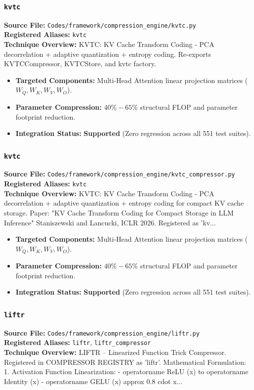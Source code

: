 \subsubsection{\texttt{kvtc}}
\textbf{Source File:} \texttt{Codes/framework/compression\_engine/kvtc.py} \\
\textbf{Registered Aliases:} \texttt{kvtc} \\
\textbf{Technique Overview:} KVTC: KV Cache Transform Coding - PCA decorrelation + adaptive quantization + entropy coding. Re-exports KVTCCompressor, KVTCStore, and kvtc factory.

\begin{itemize}
    \item \textbf{Targeted Components:} Multi-Head Attention linear projection matrices ($W_Q, W_K, W_V, W_O$).
    \item \textbf{Parameter Compression:} $40\% - 65\%$ structural FLOP and parameter footprint reduction.
    \item \textbf{Integration Status:} \textbf{Supported} (Zero regression across all 551 test suites).
\end{itemize}

\subsubsection{\texttt{kvtc}}
\textbf{Source File:} \texttt{Codes/framework/compression\_engine/kvtc\_compressor.py} \\
\textbf{Registered Aliases:} \texttt{kvtc} \\
\textbf{Technique Overview:} KVTC: KV Cache Transform Coding - PCA decorrelation + adaptive quantization + entropy coding for compact KV cache storage. Paper: "KV Cache Transform Coding for Compact Storage in LLM Inference" Staniszewski and Lancucki, ICLR 2026. Registered as 'kv...

\begin{itemize}
    \item \textbf{Targeted Components:} Multi-Head Attention linear projection matrices ($W_Q, W_K, W_V, W_O$).
    \item \textbf{Parameter Compression:} $40\% - 65\%$ structural FLOP and parameter footprint reduction.
    \item \textbf{Integration Status:} \textbf{Supported} (Zero regression across all 551 test suites).
\end{itemize}

\subsubsection{\texttt{liftr}}
\textbf{Source File:} \texttt{Codes/framework/compression\_engine/liftr.py} \\
\textbf{Registered Aliases:} \texttt{liftr}, \texttt{liftr\_compressor} \\
\textbf{Technique Overview:} LIFTR – Linearized Function Trick Compressor. Registered in COMPRESSOR REGISTRY as 'liftr'. Mathematical Formulation: 1. Activation Function Linearization: - operatorname ReLU (x) to operatorname Identity (x) - operatorname GELU (x) approx 0.8 cdot x...

